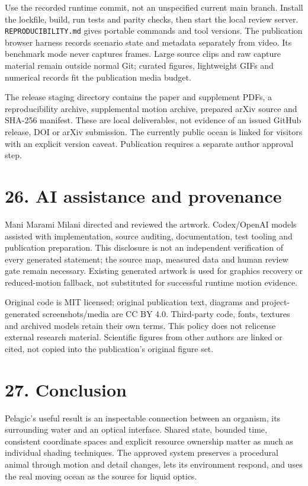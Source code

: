 \documentclass[
  english,
  11pt,
]{article}
\begin{document}
Use the recorded runtime commit, not an unspecified current main branch.
Install the lockfile, build, run tests and parity checks, then start the
local review server. \texttt{REPRODUCIBILITY.md} gives portable commands
and tool versions. The publication browser harness records scenario
state and metadata separately from video. Its benchmark mode never
captures frames. Large source clips and raw capture material remain
outside normal Git; curated figures, lightweight GIFs and numerical
records fit the publication media budget.

The release staging directory contains the paper and supplement PDFs, a
reproducibility archive, supplemental motion archive, prepared arXiv
source and SHA-256 manifest. These are local deliverables, not evidence
of an issued GitHub release, DOI or arXiv submission. The currently
public ocean is linked for visitors with an explicit version caveat.
Publication requires a separate author approval step.

\section{26. AI assistance and
provenance}\label{ai-assistance-and-provenance}

Mani Marami Milani directed and reviewed the artwork. Codex/OpenAI
models assisted with implementation, source auditing, documentation,
test tooling and publication preparation. This disclosure is not an
independent verification of every generated statement; the source map,
measured data and human review gate remain necessary. Existing generated
artwork is used for graphics recovery or reduced-motion fallback, not
substituted for successful runtime motion evidence.

Original code is MIT licensed; original publication text, diagrams and
project-generated screenshots/media are CC BY 4.0. Third-party code,
fonts, textures and archived models retain their own terms. This policy
does not relicense external research material. Scientific figures from
other authors are linked or cited, not copied into the publication's
original figure set.

\section{27. Conclusion}\label{conclusion}

Pelagic's useful result is an inspectable connection between an
organism, its surrounding water and an optical interface. Shared state,
bounded time, consistent coordinate spaces and explicit resource
ownership matter as much as individual shading techniques. The approved
system preserves a procedural animal through motion and detail changes,
lets its environment respond, and uses the real moving ocean as the
source for liquid optics.
\end{document}
